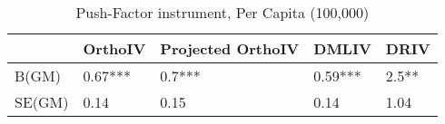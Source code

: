 \begin{table}\centering\caption{Push-Factor instrument, Per Capita (100,000)}\begin{tabular}{lllll}
\toprule
        & OrthoIV   & Projected OrthoIV   & DMLIV   & DRIV   \\
\midrule
 B(GM)  & 0.67***   & 0.7***              & 0.59*** & 2.5**  \\
 SE(GM) & 0.14      & 0.15                & 0.14    & 1.04   \\
\bottomrule
\end{tabular}\end{table}